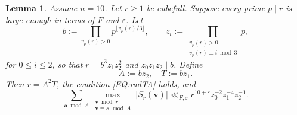 \documentclass[a4paper,11pt, twoside,reqno]{amsart}
\theoremstyle{plain}
\newtheorem{lemma}[thm]{Lemma}
\theoremstyle{definition}
\theoremstyle{remark}
\newcommand{\bfa}{\bm{a}}
\newcommand{\bfv}{\bm{v}}
\newcommand{\ve}{\varepsilon}
\renewcommand{\le}{\leqslant}
\renewcommand{\ge}{\geqslant}
\numberwithin{equation}{section}
\begin{document}
\begin{lemma}
\label{lem:q-smith-cubefull}
Assume $n=10$.
Let \(r\ge 1\) be cubefull.
Suppose every prime $p\mid r$
is large enough in terms of $F$ and $\ve$.
Let
\begin{equation}
\label{eq:q-buw}
b := \prod_{v_p(r)>0} p^{\lfloor v_p(r)/3 \rfloor},
\qquad z_i := \prod_{\substack{v_p(r)>0 \\ v_p(r) \equiv i\bmod{3}}} p,
\end{equation}
for $0\le i\le 2$,
so that $r=b^3z_1z_2^2$ and $z_0z_1z_2\mid b$.
Define
\[
A := bz_2,\quad T := bz_1.
\]
Then \(r=A^2T\), the condition \eqref{EQ:radTA} holds, and
\begin{equation}
\sum_{\bfa\bmod{A}}
\max_{\substack{\bfv\bmod{r} \\ \bfv\equiv \bfa\bmod{A}}} |S_r(\bfv)|
\ll_{F,\ve}
r^{10+\ve}z_0^{-2}z_1^{-4}z_2^{-1}.
\label{eq:q-route-zero}
\end{equation}
\end{lemma}
\end{document}
